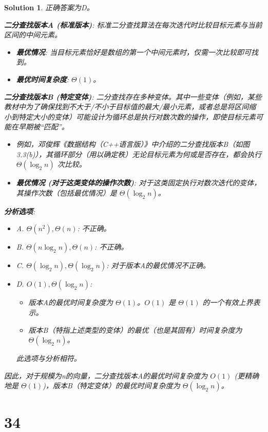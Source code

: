 \documentclass[UTF8]{report}
\newtheorem{solution}{Solution}
\theoremstyle{MyLineTheoremStyle} %
\theoremstyle{MyBlockTheoremStyle} %
\theoremstyle{MySubsubsectionStyle} %
\begin{document}
\begin{solution}
正确答案为D。

\textbf{二分查找版本A (标准版本)}:
标准二分查找算法在每次迭代时比较目标元素与当前区间的中间元素。
\begin{itemize}
    \item \textbf{最优情况}: 当目标元素恰好是数组的第一个中间元素时，仅需一次比较即可找到。
    \item \textbf{最优时间复杂度}: $\Theta(1)$。
\end{itemize}

\textbf{二分查找版本B (特定变体)}:
二分查找存在多种变体。其中一些变体（例如，某些教材中为了确保找到不大于/不小于目标值的最大/最小元素，或者总是将区间缩小到特定大小的变体）可能设计为循环总是执行对数次数的操作，即使目标元素可能在早期被“匹配”。
\begin{itemize}
    \item 例如，邓俊辉《数据结构（C++语言版）》中介绍的二分查找版本B（如图3.3(b)），其循环部分（用以确定秩）无论目标元素为何或是否存在，都会执行 $\Theta(\log_2 n)$ 次比较。
    \item \textbf{最优情况 (对于这类变体的操作次数)}: 对于这类固定执行对数次迭代的变体，其操作次数（包括最优情况）是 $\Theta(\log_2 n)$。
\end{itemize}

\textbf{分析选项}:
\begin{itemize}
    \item A. $\Theta(n^2), \Theta(n)$: 不正确。
    \item B. $\Theta(n\log_{2}n), \Theta(n)$: 不正确。
    \item C. $\Theta(\log_{2}n), \Theta(\log_{2}n)$: 对于版本A的最优情况不正确。
    \item D. $O(1), \Theta(\log_{2}n)$:
    \begin{itemize}
        \item 版本A的最优时间复杂度为 $\Theta(1)$。$O(1)$ 是 $\Theta(1)$ 的一个有效上界表示。
        \item 版本B（特指上述类型的变体）的最优（也是其固有）时间复杂度为 $\Theta(\log_{2}n)$。
    \end{itemize}
    此选项与分析相符。
\end{itemize}
因此，对于规模为n的向量，二分查找版本A的最优时间复杂度为 $O(1)$ (更精确地是 $\Theta(1)$)，版本B（特定变体）的最优时间复杂度为 $\Theta(\log_{2}n)$。
\end{solution}


\section*{34}
\end{document}
